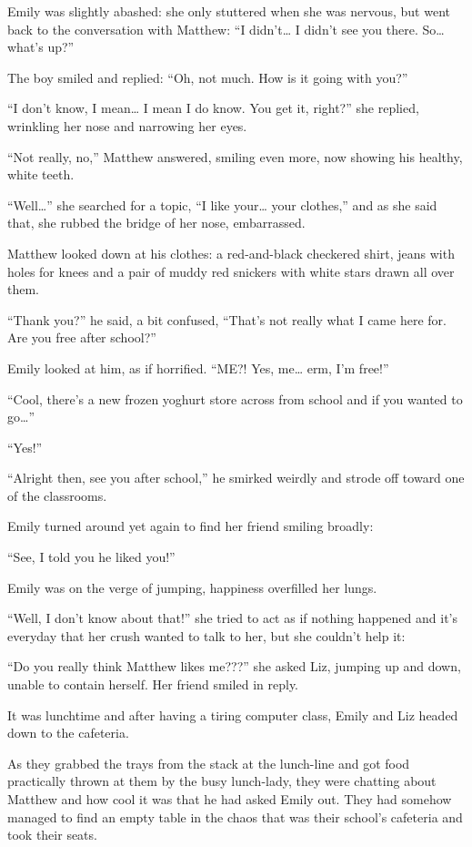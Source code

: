 Emily was slightly abashed: she only stuttered when she was nervous, but went back to the conversation with Matthew: “I didn’t… I didn’t see you there. So… what’s up?”

The boy smiled and replied: “Oh, not much. How is it going with you?”

“I don’t know, I mean… I mean I do know. You get it, right?” she replied, wrinkling her nose and narrowing her eyes.

“Not really, no,” Matthew answered, smiling even more, now showing his healthy, white teeth.

“Well…” she searched for a topic, “I like your… your clothes,” and as she said that, she rubbed the bridge of her nose, embarrassed.

Matthew looked down at his clothes: a red-and-black checkered shirt, jeans with holes for knees and a pair of muddy red snickers with white stars drawn all over them.

“Thank you?” he said, a bit confused, “That’s not really what I came here for. Are you free after school?”

Emily looked at him, as if horrified. “ME?! Yes, me… erm, I’m free!”

“Cool, there’s a new frozen yoghurt store across from school and if you wanted to go…”

“Yes!”

“Alright then, see you after school,” he smirked weirdly and strode off toward one of the classrooms.

Emily turned around yet again to find her friend smiling broadly:

“See, I told you he liked you!”

Emily was on the verge of jumping, happiness overfilled her lungs.

“Well, I don’t know about that!” she tried to act as if nothing happened and it’s everyday that her crush wanted to talk to her, but she couldn’t help it:

“Do you really think Matthew likes me???” she asked Liz, jumping up and down, unable to contain herself. Her friend smiled in reply.

\bigskip

It was lunchtime and after having a tiring computer class, Emily and Liz headed down to the cafeteria. 

As they grabbed the trays from the stack at the lunch-line and got food practically thrown at them by the busy lunch-lady, they were chatting about Matthew and how cool it was that he had asked Emily out.
They had somehow managed to find an empty table in the chaos that was their school’s cafeteria and took their seats.


